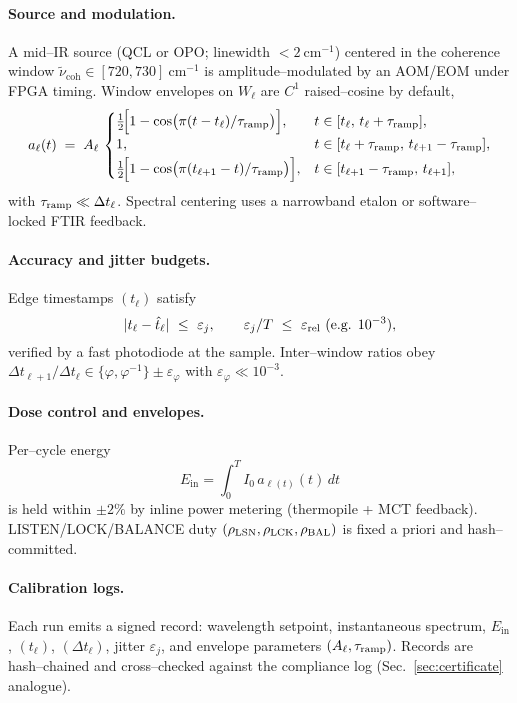 \documentclass[11pt]{article}
\begin{document}
\paragraph{Source and modulation.}
A mid–IR source (QCL or OPO; linewidth $<\!2~\mathrm{cm^{-1}}$) centered in the coherence window $\tilde\nu_{\mathrm{coh}}\in[720,730]~\mathrm{cm^{-1}}$ is amplitude–modulated by an AOM/EOM under FPGA timing. Window envelopes on $W_\ell$ are $C^1$ raised–cosine by default,
\[
a_\ell(t)\;=\;A_\ell\,
\begin{cases}
\frac12\!\Big[1-\cos\!\big(\pi (t-t_\ell)/\tau_{\rm ramp}\big)\Big], & t\in[t_\ell,\,t_\ell+\tau_{\rm ramp}],\\[2pt]
1, & t\in[t_\ell+\tau_{\rm ramp},\,t_{\ell+1}-\tau_{\rm ramp}],\\[2pt]
\frac12\!\Big[1-\cos\!\big(\pi (t_{\ell+1}-t)/\tau_{\rm ramp}\big)\Big], & t\in[t_{\ell+1}-\tau_{\rm ramp},\,t_{\ell+1}],
\end{cases}
\]
with $\tau_{\rm ramp}\ll \Delta t_\ell$. Spectral centering uses a narrowband etalon or software–locked FTIR feedback.

\paragraph{Accuracy and jitter budgets.}
Edge timestamps $(t_\ell)$ satisfy
\[
|t_\ell-\hat t_\ell|\ \le\ \varepsilon_j,\qquad \varepsilon_j/T\ \le\ \varepsilon_{\rm rel}\ (\text{e.g. }10^{-3}),
\]
verified by a fast photodiode at the sample. Inter–window ratios obey $\Delta t_{\ell+1}/\Delta t_\ell\in\{\varphi,\varphi^{-1}\}\pm \varepsilon_\varphi$ with $\varepsilon_\varphi\ll 10^{-3}$.

\paragraph{Dose control and envelopes.}
Per–cycle energy
\[
E_{\mathrm{in}}=\int_{0}^{T}\! I_0\,a_{\ell(t)}(t)\,dt
\]
is held within $\pm2\%$ by inline power metering (thermopile + MCT feedback). LISTEN/LOCK/BALANCE duty $(\rho_{\rm LSN},\rho_{\rm LCK},\rho_{\rm BAL})$ is fixed a priori and hash–committed.

\paragraph{Calibration logs.}
Each run emits a signed record: wavelength setpoint, instantaneous spectrum, $E_{\mathrm{in}}$, $(t_\ell)$, $(\Delta t_\ell)$, jitter $\varepsilon_j$, and envelope parameters $(A_\ell,\tau_{\rm ramp})$. Records are hash–chained and cross–checked against the compliance log (Sec.~\ref{sec:certificate} analogue).
\end{document}
